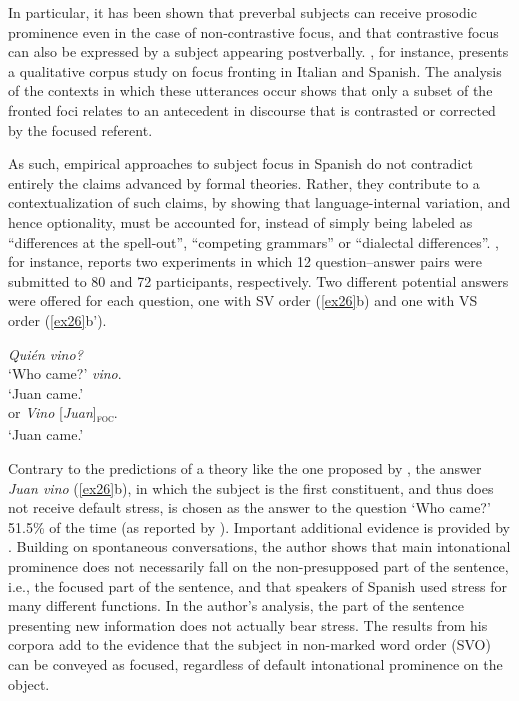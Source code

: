  In particular, it has been shown that preverbal subjects can receive prosodic prominence even in the case of non-contrastive focus, and that contrastive focus can also be expressed by a subject appearing postverbally. \textcite{brunetti2009italian}, for instance, presents a qualitative corpus study on focus fronting in Italian and Spanish. The analysis of the contexts in which these utterances occur shows that only a subset of the fronted foci relates to an antecedent in discourse that is contrasted or corrected by the focused referent.
 
As such, empirical approaches to subject focus in Spanish do not contradict entirely the claims advanced by formal theories. Rather, they contribute to a contextualization of such claims, by showing that language-internal variation, and hence optionality, must be accounted for, instead of simply being labeled as “differences at the spell-out”, “competing grammars” or “dialectal differences”. \textcite{alonso2002null}, for instance, reports two experiments in which 12 question–answer pairs were submitted to 80 and 72 participants, respectively. Two different potential answers were offered for each question,  one with SV order (\ref{ex26}b) and one with VS order (\ref{ex26}b').


 \ea \label{ex26}
 \ea \textit{Quién vino?}\\
 `Who came?'
 \normalsize \textit{vino}.\\
`Juan came.'\\
or
 \textit{Vino} {[\textit{Juan}]\textsubscript{\textsc{foc}}}\normalsize.\\
`Juan came.' \hfill \parencite[17]{alonso2002null}    
\z \z


Contrary to the predictions of a theory like the one proposed by \textcite{zubizarreta1999word}, the answer \textit{Juan vino} (\ref{ex26}b), in which the subject is the first constituent, and thus does not receive default stress, is chosen as the answer to the question `Who came?' 51.5\% of the time (as reported by \cite{biezma2014multiple}).  Important additional evidence is provided by \textcite{ocampo2003notion}. Building on spontaneous conversations, the author shows that main intonational prominence does not necessarily fall on the non-presupposed part of the sentence, i.e., the focused part of the sentence, and that speakers of Spanish used stress for many different functions.  In the author's analysis, the part of the sentence presenting new information does not actually bear stress.
The results from his corpora add to the evidence that the subject in non-marked word order (SVO) can be conveyed as focused, regardless of default intonational prominence on the object. 

